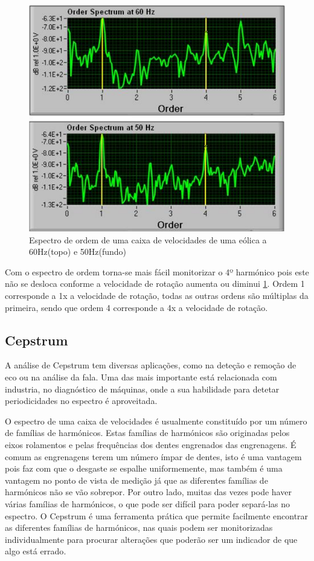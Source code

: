\begin{figure}[H]
\centering
\includegraphics[scale=0.3]{figs/order_spectrum}
\caption{Espectro de ordem de uma caixa de velocidades de uma eólica a 60Hz(topo) e 50Hz(fundo) \cite{orderAnalysis2}}\label{power espectrum 3}
\end{figure}


Com o espectro de ordem torna-se mais fácil monitorizar o 4º harmónico pois este não se desloca conforme a velocidade de rotação aumenta ou diminui \ref{power espectrum 3}. Ordem 1 corresponde a 1x a velocidade de rotação, todas as outras ordens são múltiplas da primeira, sendo que ordem 4 corresponde a 4x a velocidade de rotação.

\subsection{Cepstrum}

A análise de Cepstrum tem diversas aplicações, como na deteção e remoção de eco ou na análise da fala. Uma das mais importante está relacionada com industria, no diagnóstico de máquinas, onde a sua habilidade para detetar periodicidades no espectro é aproveitada.

O espectro de uma caixa de velocidades é usualmente constituído por um número de famílias de harmónicos. Estas famílias de harmónicos são originadas pelos eixos rolamentos e pelas frequências dos dentes engrenados das engrenagens. É comum as engrenagens terem um número ímpar de dentes, isto é uma vantagem pois faz com que o desgaste se espalhe uniformemente, mas também é uma vantagem no ponto de vista de medição já que as diferentes famílias de harmónicos não se vão sobrepor. Por outro lado, muitas das vezes pode haver várias famílias de harmónicos, o que pode ser difícil para poder separá-las no espectro. O Cepstrum é uma ferramenta prática que permite facilmente encontrar as diferentes famílias de harmónicos, nas quais podem ser monitorizadas individualmente para procurar alterações que poderão ser um indicador de que algo está errado\cite{Notes2}.

